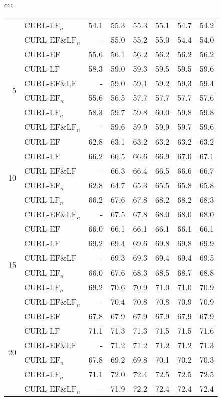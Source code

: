 \documentclass[journal,11pt]{IEEEtran}
\begin{document}
\begin{table*}[!ht]
\begin{center}
{\begin{tabular}{ccc}
\begin{tabular}{|r|l|rrrrrr|}
& CURL-LF$_n$& 54.1 & 55.3 & 55.3 & 55.1 & 54.7 & 54.2 \\
& CURL-EF\&LF$_n$& - & 55.0 & 55.2 & 55.0 & 54.4 & 54.0 \\
\hline
\multirow{6}{*}{5}
& CURL-EF & 55.6 & 56.1 & 56.2 & 56.2 & 56.2 & 56.2 \\
& CURL-LF& 58.3 & 59.0 & 59.3 & 59.5 & 59.5 & 59.6 \\
& CURL-EF\&LF& - & 59.0 & 59.1 & 59.2 & 59.3 & 59.4 \\
& CURL-EF$_n$& 55.6 & 56.5 & 57.7 & 57.7 & 57.7 & 57.6 \\
& CURL-LF$_n$& 58.3 & 59.7 & 59.8 & 60.0 & 59.8 & 59.8 \\
& CURL-EF\&LF$_n$& - & 59.6 & 59.9 & 59.9 & 59.7 & 59.6 \\
\hline
\multirow{6}{*}{10}
& CURL-EF & 62.8 & 63.1 & 63.2 & 63.2 & 63.2 & 63.2 \\
& CURL-LF& 66.2 & 66.5 & 66.6 & 66.9 & 67.0 & 67.1 \\
& CURL-EF\&LF& - & 66.3 & 66.4 & 66.5 & 66.6 & 66.7 \\
& CURL-EF$_n$& 62.8 & 64.7 & 65.3 & 65.5 & 65.8 & 65.8 \\
& CURL-LF$_n$& 66.2 & 67.6 & 67.8 & 68.2 & 68.2 & 68.3 \\
& CURL-EF\&LF$_n$& - & 67.5 & 67.8 & 68.0 & 68.0 & 68.0 \\
\hline
\multirow{6}{*}{15}
& CURL-EF & 66.0 & 66.1 & 66.1 & 66.1 & 66.1 & 66.1 \\
& CURL-LF& 69.2 & 69.4 & 69.6 & 69.8 & 69.8 & 69.9 \\
& CURL-EF\&LF& - & 69.3 & 69.3 & 69.4 & 69.4 & 69.5 \\
& CURL-EF$_n$& 66.0 & 67.6 & 68.3 & 68.5 & 68.7 & 68.8 \\
& CURL-LF$_n$& 69.2 & 70.6 & 70.9 & 71.0 & 71.0 & 70.9 \\
& CURL-EF\&LF$_n$& - & 70.4 & 70.8 & 70.8 & 70.9 & 70.9 \\
\hline
\multirow{6}{*}{20}
& CURL-EF & 67.8 & 67.9 & 67.9 & 67.9 & 67.9 & 67.9 \\
& CURL-LF& 71.1 & 71.3 & 71.3 & 71.5 & 71.5 & 71.6 \\
& CURL-EF\&LF& - & 71.2 & 71.2 & 71.2 & 71.2 & 71.3 \\
& CURL-EF$_n$& 67.8 & 69.2 & 69.8 & 70.1 & 70.2 & 70.3 \\
& CURL-LF$_n$& 71.1 & 72.0 & 72.4 & 72.5 & 72.5 & 72.5 \\
& CURL-EF\&LF$_n$& - & 71.9 & 72.2 & 72.4 & 72.4 & 72.4 \\
		\hline
\end{tabular}


\end{tabular}}
\end{center}
\end{table*}
\end{document}
